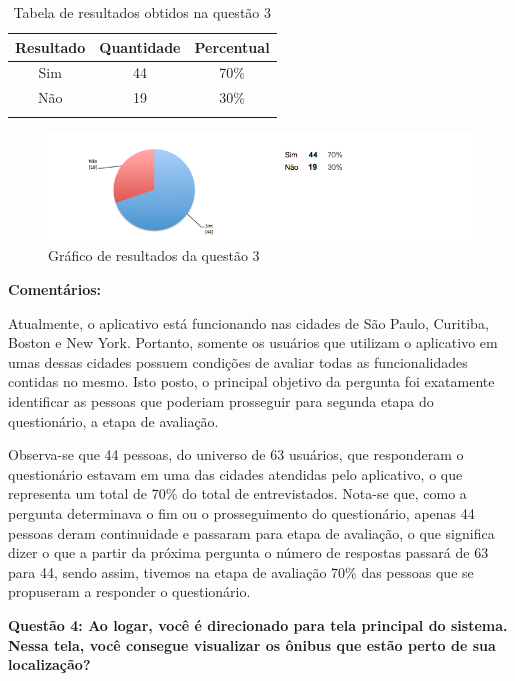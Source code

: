 \begin{center}
\begin{longtable}{c|c|c}
\hline
    \multicolumn{1}{c}{\textbf{Resultado}} & \multicolumn{1}{c}{\textbf{Quantidade}} & \multicolumn{1}{c}{\textbf{Percentual}} \\
\hline
    Sim & 44 &  70\%\\
    \hline
    Não & 19 & 30\%\\
    \hline
\caption{Tabela de resultados obtidos na questão 3}
\end{longtable}
\end{center}


\begin{figure}[h]
\begin{center}
  \includegraphics[width=16cm]{images/graficos/questao3.png}
  \caption{Gráfico de resultados da questão 3}
  \label{fig:questao3}
\end{center}
\end{figure}

\textbf{Comentários:}

Atualmente, o aplicativo está funcionando nas cidades de São Paulo, Curitiba, Boston e New York. Portanto, somente os usuários que utilizam o aplicativo em umas dessas cidades possuem condições de avaliar todas as funcionalidades contidas no mesmo. Isto posto, o principal objetivo da pergunta foi exatamente identificar as pessoas que  poderiam prosseguir para segunda etapa do questionário, a etapa de avaliação. 
	
Observa-se que 44 pessoas, do universo de 63 usuários, que responderam o questionário estavam em uma das cidades atendidas pelo aplicativo, o que representa um total de 70\% do total de entrevistados. Nota-se que, como a pergunta determinava o fim ou o prosseguimento do questionário, apenas 44 pessoas deram continuidade e passaram para etapa de avaliação, o que significa dizer o que a partir da próxima pergunta o número de respostas passará de 63 para 44, sendo assim, tivemos na etapa de avaliação 70\% das pessoas que se propuseram a responder o questionário.\newline

\textbf{Questão 4: Ao logar, você é direcionado para tela principal do sistema. Nessa tela, você consegue visualizar os ônibus que estão perto de sua localização?}

